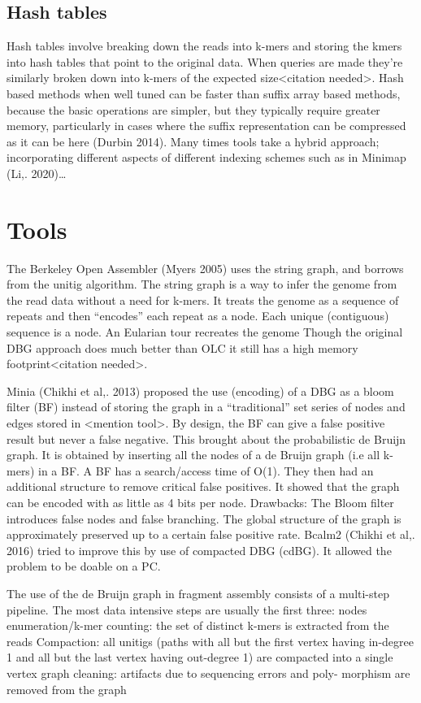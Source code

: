 \documentclass[11pt]{article}
\begin{document}
\subsection{Hash tables}
\label{sec:orgcdfe9d2}
Hash tables involve breaking down the reads into k-mers and storing the kmers into hash tables that point to the original data. When queries are made they’re similarly broken down into k-mers of the expected size<citation needed>. Hash based methods when well tuned can be faster than suffix array based methods, because the basic operations are simpler, but they typically require greater memory, particularly in cases where the suffix representation can be compressed as it can be here (Durbin 2014).
Many times tools take a hybrid approach; incorporating different aspects of different indexing schemes such as in Minimap (Li,. 2020)\ldots{}
\section{Tools}
\label{sec:org93ebf4e}
The Berkeley Open Assembler (Myers 2005) uses the string graph, and borrows from the unitig algorithm. The string graph is a way to infer the genome from the read data without a need for k-mers. It treats the genome as a sequence of repeats and then “encodes” each repeat as a node. Each unique (contiguous) sequence is a node. An Eularian tour recreates the genome
Though the original DBG approach does much better than OLC it still has a high memory footprint<citation needed>.

Minia (Chikhi et al,. 2013) proposed the use (encoding) of a DBG as a bloom filter (BF) instead of storing the graph in a “traditional” set series of nodes and edges stored in <mention tool>. By design, the BF can give a false positive result but never a false negative. This brought about the probabilistic de Bruijn graph. It is obtained by inserting all the nodes of a de Bruijn graph (i.e all k-mers) in a BF. A BF has a search/access time of O(1). They then had an additional structure to remove critical false positives. It showed that the graph can be encoded with as little as 4 bits per node.
Drawbacks: 
The Bloom filter introduces false nodes and false branching.
The global structure of the graph is approximately preserved up to a certain false positive rate.
Bcalm2 (Chikhi et al,. 2016) tried to improve this by use of compacted DBG (cdBG). It allowed the problem to be doable on a PC.


The use of the de Bruijn graph in fragment assembly consists of a multi-step pipeline. The most data intensive steps are usually the first three: 
nodes enumeration/k-mer counting: the set of distinct k-mers is extracted from the reads 
Compaction: all unitigs (paths with all but the first vertex having in-degree 1 and all but the last vertex having out-degree 1) are compacted into a single vertex
graph cleaning: artifacts due to sequencing errors and poly- morphism are removed from the graph
\end{document}
